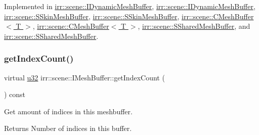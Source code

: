 Implemented in \hyperlink{classirr_1_1scene_1_1IDynamicMeshBuffer_adc483bdd7dfac4eb54e25c763ae1dae0}{irr\+::scene\+::\+I\+Dynamic\+Mesh\+Buffer}, \hyperlink{classirr_1_1scene_1_1IDynamicMeshBuffer_adc483bdd7dfac4eb54e25c763ae1dae0}{irr\+::scene\+::\+I\+Dynamic\+Mesh\+Buffer}, \hyperlink{structirr_1_1scene_1_1SSkinMeshBuffer_adc00b4ce3b46d952575203c6e275e592}{irr\+::scene\+::\+S\+Skin\+Mesh\+Buffer}, \hyperlink{structirr_1_1scene_1_1SSkinMeshBuffer_adc00b4ce3b46d952575203c6e275e592}{irr\+::scene\+::\+S\+Skin\+Mesh\+Buffer}, \hyperlink{classirr_1_1scene_1_1CMeshBuffer_ac5585f4983423a4ba1f4ab4aba112c95}{irr\+::scene\+::\+C\+Mesh\+Buffer$<$ T $>$}, \hyperlink{classirr_1_1scene_1_1CMeshBuffer_ac5585f4983423a4ba1f4ab4aba112c95}{irr\+::scene\+::\+C\+Mesh\+Buffer$<$ T $>$}, \hyperlink{structirr_1_1scene_1_1SSharedMeshBuffer_a97a95470c8956fc0120466e57698081a}{irr\+::scene\+::\+S\+Shared\+Mesh\+Buffer}, and \hyperlink{structirr_1_1scene_1_1SSharedMeshBuffer_a97a95470c8956fc0120466e57698081a}{irr\+::scene\+::\+S\+Shared\+Mesh\+Buffer}.

\mbox{\label{classirr_1_1scene_1_1IMeshBuffer_a96e08662e15b1205516b87ada3301551}} 
\subsubsection{\texorpdfstring{get\+Index\+Count()}{getIndexCount()}\hspace{0.1cm}{\footnotesize\ttfamily [2/2]}}
{\footnotesize\ttfamily virtual \hyperlink{namespaceirr_a0416a53257075833e7002efd0a18e804}{u32} irr\+::scene\+::\+I\+Mesh\+Buffer\+::get\+Index\+Count (\begin{DoxyParamCaption}{ }\end{DoxyParamCaption}) const\hspace{0.3cm}{\ttfamily [pure virtual]}}



Get amount of indices in this meshbuffer. 

\begin{DoxyReturn}{Returns}
Number of indices in this buffer. 
\end{DoxyReturn}


